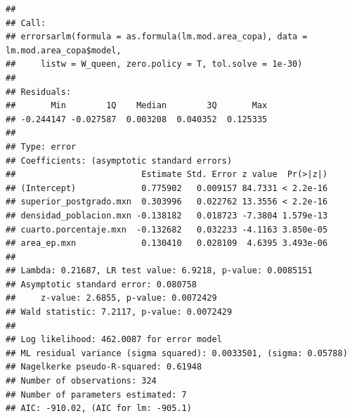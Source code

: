 \documentclass[12pt,]{book}
\newenvironment{Shaded}{\begin{snugshade}}{\end{snugshade}}
\newcommand{\KeywordTok}[1]{\textcolor[rgb]{0.13,0.29,0.53}{\textbf{#1}}}
\newcommand{\DataTypeTok}[1]{\textcolor[rgb]{0.13,0.29,0.53}{#1}}
\newcommand{\FloatTok}[1]{\textcolor[rgb]{0.00,0.00,0.81}{#1}}
\newcommand{\StringTok}[1]{\textcolor[rgb]{0.31,0.60,0.02}{#1}}
\newcommand{\CommentTok}[1]{\textcolor[rgb]{0.56,0.35,0.01}{\textit{#1}}}
\newcommand{\OperatorTok}[1]{\textcolor[rgb]{0.81,0.36,0.00}{\textbf{#1}}}
\newcommand{\NormalTok}[1]{#1}
\begin{document}
\begin{Shaded}
\end{Shaded}

\begin{verbatim}
## 
## Call:
## errorsarlm(formula = as.formula(lm.mod.area_copa), data = lm.mod.area_copa$model, 
##     listw = W_queen, zero.policy = T, tol.solve = 1e-30)
## 
## Residuals:
##       Min        1Q    Median        3Q       Max 
## -0.244147 -0.027587  0.003208  0.040352  0.125335 
## 
## Type: error 
## Coefficients: (asymptotic standard errors) 
##                         Estimate Std. Error z value  Pr(>|z|)
## (Intercept)             0.775902   0.009157 84.7331 < 2.2e-16
## superior_postgrado.mxn  0.303996   0.022762 13.3556 < 2.2e-16
## densidad_poblacion.mxn -0.138182   0.018723 -7.3804 1.579e-13
## cuarto.porcentaje.mxn  -0.132682   0.032233 -4.1163 3.850e-05
## area_ep.mxn             0.130410   0.028109  4.6395 3.493e-06
## 
## Lambda: 0.21687, LR test value: 6.9218, p-value: 0.0085151
## Asymptotic standard error: 0.080758
##     z-value: 2.6855, p-value: 0.0072429
## Wald statistic: 7.2117, p-value: 0.0072429
## 
## Log likelihood: 462.0087 for error model
## ML residual variance (sigma squared): 0.0033501, (sigma: 0.05788)
## Nagelkerke pseudo-R-squared: 0.61948 
## Number of observations: 324 
## Number of parameters estimated: 7 
## AIC: -910.02, (AIC for lm: -905.1)
\end{verbatim}

\begin{Shaded}
\end{Shaded}
\end{document}
